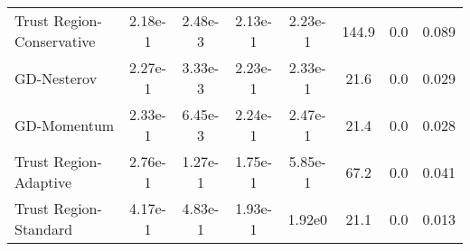 \documentclass{article}
\begin{document}
\begin{table}[htbp]
{\begin{tabular}{l*{7}{S[table-format=2.2e-1]}}
Trust Region-Conservative & 2.18e-1 & 2.48e-3 & 2.13e-1 & 2.23e-1 & 144.9 & 0.0 & 0.089 \\
GD-Nesterov & 2.27e-1 & 3.33e-3 & 2.23e-1 & 2.33e-1 & 21.6 & 0.0 & 0.029 \\
GD-Momentum & 2.33e-1 & 6.45e-3 & 2.24e-1 & 2.47e-1 & 21.4 & 0.0 & 0.028 \\
Trust Region-Adaptive & 2.76e-1 & 1.27e-1 & 1.75e-1 & 5.85e-1 & 67.2 & 0.0 & 0.041 \\
Trust Region-Standard & 4.17e-1 & 4.83e-1 & 1.93e-1 & 1.92e0 & 21.1 & 0.0 & 0.013 \\
\bottomrule
\end{tabular}
}
\end{table}
\end{document}

